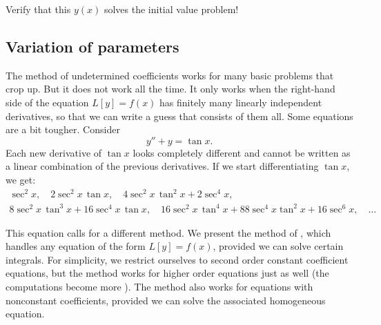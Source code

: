 \begin{exercise}
Verify that this $y(x)$ solves the initial value problem!
\end{exercise}

\subsection{Variation of parameters}

The method of undetermined coefficients works for many basic
problems that crop up.  But it does not work all the time.  It only works
when the right-hand side of the equation $L[y] = f(x)$ has finitely many
linearly independent derivatives, so that we can write a guess that consists
of them all.  Some equations are a bit tougher.  Consider
\begin{equation*}
y''+y = \tan x .
\end{equation*}
Each new derivative of $\tan x$ looks completely different and
cannot be written as a linear combination of the previous derivatives.
If we start differentiating $\tan x$, we get:
\begin{multline*}
\sec^2 x, \quad
2\sec^2 x \, \tan x, \quad
4 \sec^2 x \, \tan^2 x + 2 \sec^4 x, \\
8 \sec^2 x \, \tan^3 x + 16 \sec^4 x \, \tan x, \quad
16\sec^2 x \, \tan^4 x + 88 \sec^4 x \tan^2 x + 16 \sec^6 x, \quad
\ldots
\end{multline*}

This equation calls for a different method.  We present the method of
\emph{}, which handles any equation of
the form $L[y] = f(x)$,
provided we can solve certain integrals.  For simplicity, we restrict
ourselves to second order constant coefficient equations,
but the method works for higher
order equations just as well (the computations become more
). %
The method also works for equations with nonconstant coefficients,
provided we can solve the associated homogeneous equation.

